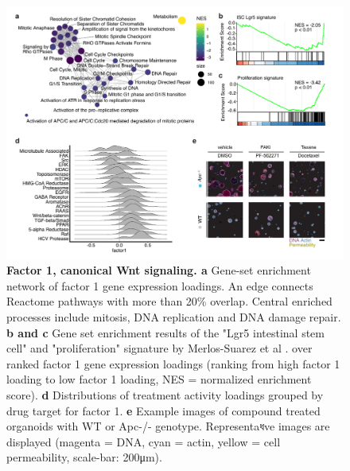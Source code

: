 \begin{flushleft}
\begin{figure}[h!]
\centering
\includegraphics[width=\textwidth,
                height=\textheight,
                keepaspectratio]{figures/adenomaprofiling/pdf/fig_2_1.pdf}
\caption[Factor 1, canonical Wnt signaling]{\textbf{Factor 1, canonical Wnt signaling. a} Gene-set enrichment network of factor 1 gene expression loadings. An edge connects Reactome pathways with more than 20\% overlap. Central enriched processes include mitosis, DNA replication and DNA damage repair. \textbf{b and c} Gene set enrichment results of the "Lgr5 intestinal stem cell" and "proliferation" signature by Merlos-Suarez et al \citep{Merlos-Suarez2011-gd}. over ranked factor 1 gene expression loadings (ranking from high factor 1 loading to low factor 1 loading, NES = normalized enrichment score). \textbf{d} Distributions of treatment activity loadings grouped by drug target for factor 1. \textbf{e} Example images of compound treated organoids with WT or Apc-/- genotype. Representaধve images are displayed (magenta = DNA, cyan = actin, yellow = cell permeability, scale-bar: 200μm).}
\label{fig_190}
\end{figure}
\bigbreak


\end{flushleft}
